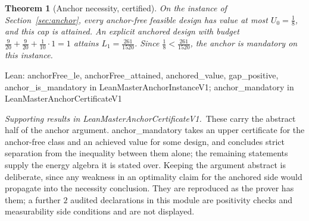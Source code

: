 \documentclass[conference]{IEEEtran}
\newtheorem{theorem}{Theorem}
\theoremstyle{definition}
\newcommand{\lean}[1]{\textsf{\footnotesize #1}}
\newcommand{\leanbox}[1]{%
  \par\vspace{2pt}\noindent
  {\footnotesize\textsf{Lean: #1}}\par\vspace{2pt}}
\begin{document}
\begin{theorem}[Anchor necessity, certified]
\label{thm:anchor}
On the instance of Section~\ref{sec:anchor}, every anchor-free feasible design has value at
most $U_{0}=\tfrac18$, and this cap is attained. An explicit anchored design with budget
$\tfrac{9}{20}+\tfrac{9}{20}+\tfrac{1}{10}\cdot1=1$ attains $L_{1}=\tfrac{261}{1520}$. Since
$\tfrac18<\tfrac{261}{1520}$, the anchor is mandatory on this instance.
\end{theorem}

\leanbox{\lean{anchorFree\_le}, \lean{anchorFree\_attained}, \lean{anchored\_value},
\lean{gap\_positive}, \lean{anchor\_is\_mandatory} in \lean{LeanMasterAnchorInstanceV1};
\lean{anchor\_mandatory} in \lean{LeanMasterAnchorCertificateV1}}

\noindent\emph{Supporting results in \lean{LeanMasterAnchorCertificateV1}.}~These carry the abstract half of the anchor argument. \lean{anchor\_mandatory} takes an upper certificate for the anchor-free class and an achieved value for some design, and concludes strict separation from the inequality between them alone; the remaining statements supply the energy algebra it is stated over. Keeping the argument abstract is deliberate, since any weakness in an optimality claim for the anchored side would propagate into the necessity conclusion. They are reproduced as the prover has them; a further $2$ audited declarations in this module are positivity checks and measurability side conditions and are not displayed.
\end{document}
